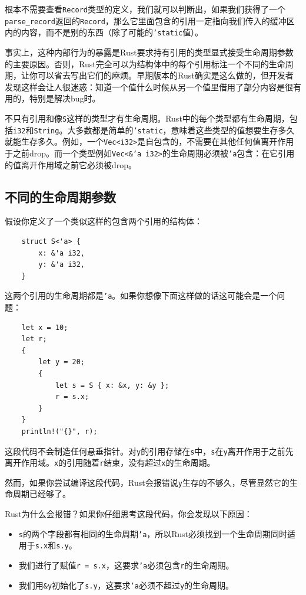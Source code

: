 根本不需要查看\texttt{Record}类型的定义，我们就可以判断出，如果我们获得了一个\texttt{parse\_record}返回的\texttt{Record}，那么它里面包含的引用一定指向我们传入的缓冲区内的内容，而不是别的东西（除了可能的\texttt{'static}值）。

事实上，这种内部行为的暴露是Rust要求持有引用的类型显式接受生命周期参数的主要原因。否则，Rust完全可以为结构体中的每个引用标注一个不同的生命周期，让你可以省去写出它们的麻烦。早期版本的Rust确实是这么做的，但开发者发现这样会让人很迷惑：知道一个值什么时候从另一个值里借用了部分内容是很有用的，特别是解决bug时。

不只有引用和像\texttt{S}这样的类型才有生命周期。Rust中的每个类型都有生命周期，包括\texttt{i32}和\texttt{String}。大多数都是简单的\texttt{'static}，意味着这些类型的值想要生存多久就能生存多久。例如，一个\texttt{Vec<i32>}是自包含的，不需要在其他任何值离开作用于之前drop。而一个类型例如\texttt{Vec<\&'a i32>}的生命周期必须被\texttt{'a}包含：在它引用的值离开作用域之前它必须被drop。

\subsection{不同的生命周期参数}
假设你定义了一个类似这样的包含两个引用的结构体：
\begin{verbatim}
    struct S<'a> {
        x: &'a i32,
        y: &'a i32,
    }
\end{verbatim}

这两个引用的生命周期都是\texttt{'a}。如果你想像下面这样做的话这可能会是一个问题：
\begin{verbatim}
    let x = 10;
    let r;
    {
        let y = 20;
        {
            let s = S { x: &x, y: &y };
            r = s.x;
        }
    }
    println!("{}", r);
\end{verbatim}

这段代码不会制造任何悬垂指针。对\texttt{y}的引用存储在\texttt{s}中，\texttt{s}在\texttt{y}离开作用于之前先离开作用域。\texttt{x}的引用随着\texttt{r}结束，没有超过\texttt{x}的生命周期。

然而，如果你尝试编译这段代码，Rust会报错说\texttt{y}生存的不够久，尽管显然它的生命周期已经够了。

Rust为什么会报错？如果你仔细思考这段代码，你会发现以下原因：
\begin{itemize}
    \item \texttt{s}的两个字段都有相同的生命周期\texttt{'a}，所以Rust必须找到一个生命周期同时适用于\texttt{s.x}和\texttt{s.y}。
    \item 我们进行了赋值\texttt{r = s.x}，这要求\texttt{'a}必须包含\texttt{r}的生命周期。
    \item 我们用\texttt{\&y}初始化了\texttt{s.y}，这要求\texttt{'a}必须不超过\texttt{y}的生命周期。
\end{itemize}


